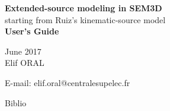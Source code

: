 \documentclass[letterpaper,11pt,titlepage,final]{report}
\def\MonthYear{June 2017}
\begin{document}
\parindent 0pt
\parskip 10pt


\thispagestyle{empty}
\vspace*{\fill}
\begin{center}


\vspace*{1mm}
{\Huge\bf{ Extended-source modeling in SEM3D}}\\[2mm]
{\Large starting from Ruiz's kinematic-source model  }\\[5mm]
{\Large \bf{User's Guide}}





\vspace*{3cm}
\fdunB
\MonthYear \\[3cm]
Elif ORAL\\[2mm]
{\small

E-mail: elif.oral@centralesupelec.fr \\
}
\end{center}
\vfill
\thispagestyle{empty}
\hspace*{0pt}
\newpage
\thispagestyle{empty}
\vspace*{\fill}


\newpage
{\parskip 0pt
  \tableofcontents
}
\newpage








 {Biblio}
\end{document}
